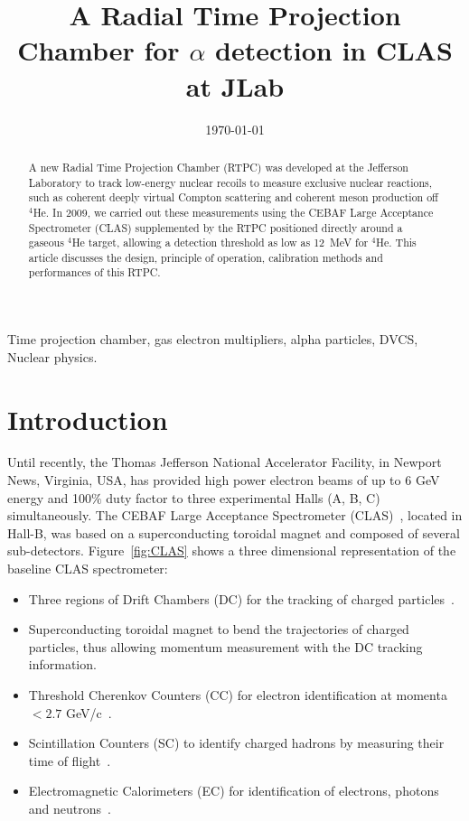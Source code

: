 \documentclass[preprint,5p]{elsarticle}
\begin{document}
\title{\vspace{-15mm}\fontsize{24pt}{10pt}\selectfont\textbf{A Radial Time 
Projection Chamber for $\alpha$ detection in CLAS at JLab}}
  

\date{\today}

\begin{abstract}
A new Radial Time Projection Chamber (RTPC) was developed at the Jefferson 
Laboratory to track low-energy nuclear recoils to measure
exclusive nuclear reactions, such as coherent deeply virtual Compton scattering
and coherent meson production off $^4$He. In
2009, we carried out these measurements using the CEBAF Large
Acceptance Spectrometer (CLAS) supplemented by
the RTPC positioned directly around a gaseous $^4$He target, allowing a detection
threshold as low as 12~MeV for $^4$He. This article discusses the design,
principle of operation, calibration methods and performances of this RTPC.
\end{abstract}

\maketitle

\begin{keywords}
Time projection chamber, gas electron multipliers, alpha particles, DVCS, 
Nuclear physics.
\end{keywords}

\section{Introduction} \label{sec:level1}

Until recently, the Thomas Jefferson National Accelerator Facility, in 
Newport News, Virginia, USA, has provided high power electron beams of 
up to 6 GeV energy and 100$\%$ duty factor to three experimental Halls (A, B, C) 
simultaneously. The CEBAF Large
Acceptance Spectrometer (CLAS)~\cite{Mecking:2003zu}, located
in Hall-B, was based on a superconducting toroidal magnet and composed of 
several sub-detectors. Figure~\ref{fig:CLAS} shows a three dimensional 
representation of the baseline CLAS spectrometer:
\begin{itemize}
 \item Three regions of Drift Chambers (DC) for the tracking of charged 
       particles~\cite{Mestayer:2000we}.
 \item Superconducting toroidal magnet to bend the trajectories 
       of charged particles, thus allowing momentum measurement with the DC tracking information.
 \item Threshold Cherenkov Counters (CC) for electron identification at momenta 
    $<2.7$ GeV/c~\cite{Adams:2001kk}.
 \item Scintillation Counters (SC) to identify charged hadrons by measuring their 
       time of flight~\cite{Smith:1999ii}.
 \item Electromagnetic Calorimeters (EC) for identification of electrons, 
       photons and neutrons~\cite{Amarian:2001zs}.
\end{itemize}
\end{document}
